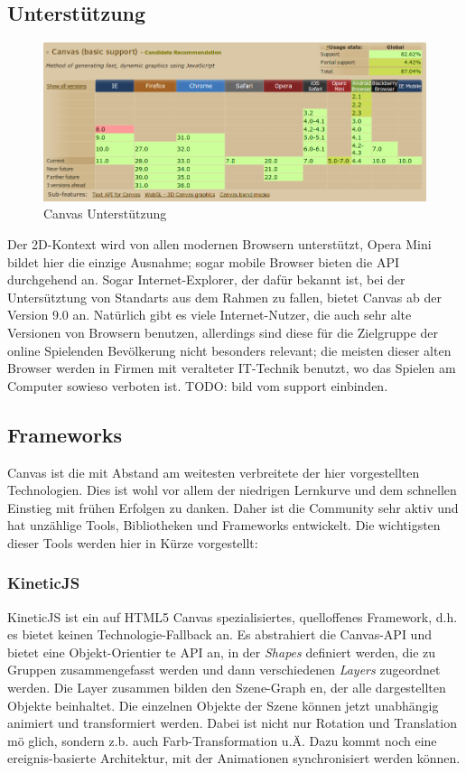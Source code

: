 \documentclass[a4paper, 12pt]{article}
\begin{document}
\subsection{Unterstützung}
\begin{figure}[H]
	\begin{center}
		\includegraphics[width=\textwidth]{assets/canvas_support.png} 
	\end{center}
	\caption{Canvas Unterstützung}
	\label{canvas_support}
\end{figure}
Der 2D-Kontext wird von allen modernen Browsern unterstützt, Opera Mini bildet hier die einzige Ausnahme; sogar mobile Browser bieten die API durchgehend an. Sogar Internet-Explorer, der dafür bekannt ist, bei der Untersütztung von Standarts aus dem Rahmen zu fallen, bietet Canvas ab der Version 9.0 an. Natürlich gibt es viele Internet-Nutzer, die auch sehr alte Versionen von Browsern benutzen, allerdings sind diese für die Zielgruppe der online Spielenden Bevölkerung nicht besonders relevant; die meisten dieser alten Browser werden in Firmen mit veralteter IT-Technik benutzt, wo das Spielen am Computer sowieso verboten ist.
TODO: bild vom support einbinden.
\subsection{Frameworks}
Canvas ist die mit Abstand am weitesten verbreitete der hier vorgestellten Technologien. Dies ist wohl vor allem der niedrigen Lernkurve und dem schnellen Einstieg mit frühen Erfolgen zu danken. Daher ist die Community sehr aktiv und hat unzählige Tools, Bibliotheken und Frameworks entwickelt. Die wichtigsten dieser Tools werden hier in Kürze vorgestellt:
\subsubsection{KineticJS}
KineticJS ist ein auf HTML5 Canvas spezialisiertes, quelloffenes Framework, d.h. es bietet keinen Technologie-Fallback an. Es abstrahiert die Canvas-API und bietet eine Objekt-Orientier
te API an, in der \emph{Shapes} definiert werden, die zu Gruppen zusammengefasst werden und dann verschiedenen \emph{Layers} zugeordnet werden. Die Layer zusammen bilden den Szene-Graph
en, der alle dargestellten Objekte beinhaltet. Die einzelnen Objekte der Szene können jetzt unabhängig animiert und transformiert werden. Dabei ist nicht nur Rotation und Translation mö
glich, sondern z.b. auch Farb-Transformation u.Ä. Dazu kommt noch eine ereignis-basierte Architektur, mit der Animationen synchronisiert werden können.
\end{document}
